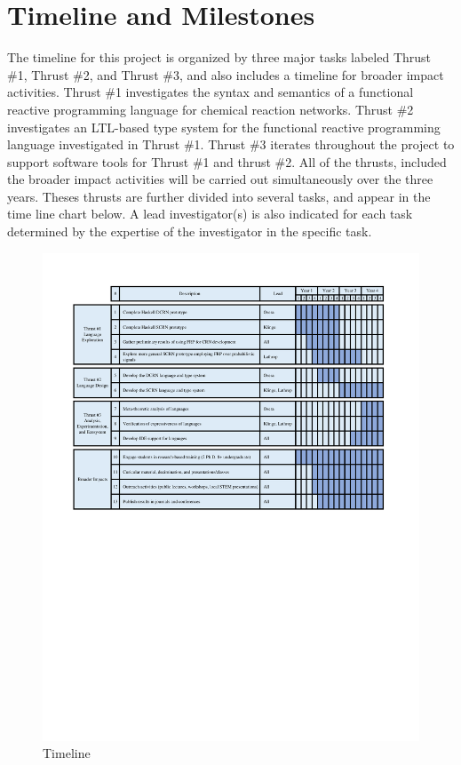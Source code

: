 \section{Timeline and Milestones}
The timeline for this project is organized by three major tasks labeled Thrust \#1, Thrust \#2, and Thrust \#3, and also includes a timeline for broader impact activities.  Thrust \#1 investigates the syntax and semantics of a functional reactive programming language for chemical reaction networks.  Thrust \#2 investigates an LTL-based type system for the functional reactive programming language investigated in Thrust \#1.  Thrust \#3 iterates throughout the project to support software tools for Thrust \#1 and thrust \#2.  All of the thrusts, included the broader impact activities will be carried out simultaneously over the three years.  Theses thrusts are further divided into several tasks, and appear in the time line chart below.  A lead investigator(s) is also indicated for each task determined by the expertise of the investigator in the specific task.
\begin{figure}[h!]
    \centering
    \includegraphics[width=6.4in]{TimeLine.pdf}
    \caption{Timeline}
\end{figure}


